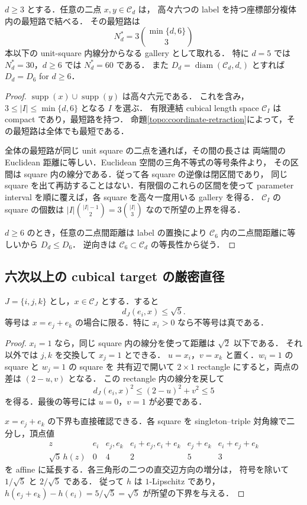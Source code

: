 \begin{corollary}
\label{topo:six-label-gallery}
$d\ge3$ とする．任意の二点 $x,y\in\mathcal C_d$ は，
高々六つの label を持つ座標部分複体内の最短路で結べる．
その最短路は
\[
 N_d^*=3\binom{\min\{d,6\}}{3}
\]
本以下の unit-square 内線分からなる gallery として取れる．
特に $d=5$ では $N_d^*=30$，$d\ge6$ では $N_d^*=60$ である．
また $D_d=\operatorname{diam}(\mathcal C_d,d_\square)$ とすれば
$D_d=D_6$ for $d\ge6$．
\end{corollary}
\begin{proof}
$\operatorname{supp}(x)\cup\operatorname{supp}(y)$ は高々六元である．
これを含み，$3\le|I|\le\min\{d,6\}$ となる $I$ を選ぶ．
有限連結 cubical length space $\mathcal C_I$ は compact であり，最短路を持つ．
命題\ref{topo:coordinate-retraction}によって，その最短路は全体でも最短である．

全体の最短路が同じ unit square の二点を通れば，その間の長さは
両端間の Euclidean 距離に等しい．Euclidean 空間の三角不等式の等号条件より，
その区間は square 内の線分である．従って各 square の逆像は閉区間であり，
同じ square を出て再訪することはない．有限個のこれらの区間を使って
parameter interval を順に覆えば，各 square を高々一度用いる gallery を得る．
$\mathcal C_I$ の square の個数は $|I|\binom{|I|-1}{2}=3\binom{|I|}{3}$
なので所望の上界を得る．

$d\ge6$ のとき，任意の二点間距離は label の置換により
$\mathcal C_6$ 内の二点間距離に等しいから $D_d\le D_6$．
逆向きは $\mathcal C_6\subset\mathcal C_d$ の等長性から従う．
\end{proof}


\subsection{六次以上の cubical target の厳密直径}

\begin{lemma}
\label{topo:corner-singleton-radius}
$J=\{i,j,k\}$ とし，$x\in\mathcal C_J$ とする．すると
\[
 d_J(e_i,x)\le\sqrt5.
\]
等号は $x=e_j+e_k$ の場合に限る．特に $x_i>0$ なら不等号は真である．
\end{lemma}
\begin{proof}
$x_i=1$ なら，同じ square 内の線分を使って距離は $\sqrt2$ 以下である．
それ以外では $j,k$ を交換して $x_j=1$ とできる．
$u=x_i$，$v=x_k$ と置く．$w_i=1$ の square と $w_j=1$ の square を
共有辺で開いて $2\times1$ rectangle にすると，両点の差は $(2-u,v)$ となる．
この rectangle 内の線分を戻して
\[
 d_J(e_i,x)^2\le(2-u)^2+v^2\le5
\]
を得る．最後の等号には $u=0$，$v=1$ が必要である．

$x=e_j+e_k$ の下界も直接確認できる．各 square を singleton--triple
対角線で二分し，頂点値
\[
\begin{array}{c|ccccc}
z&e_i&e_j,e_k&e_i+e_j,e_i+e_k&e_j+e_k&e_i+e_j+e_k\\\hline
\sqrt5\,h(z)&0&4&2&5&3
\end{array}
\]
を affine に延長する．各三角形の二つの直交辺方向の増分は，
符号を除いて $1/\sqrt5$ と $2/\sqrt5$ である．
従って $h$ は $1$-Lipschitz であり，
$h(e_j+e_k)-h(e_i)=5/\sqrt5=\sqrt5$ が所望の下界を与える．
\end{proof}

